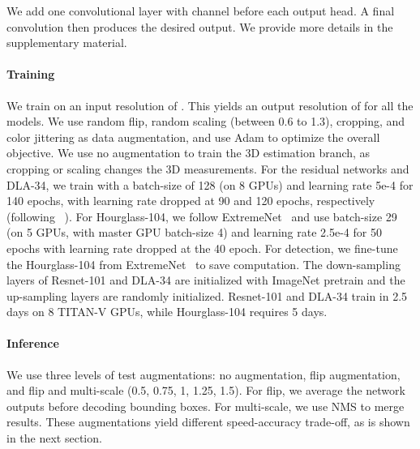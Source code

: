 \documentclass[10pt,twocolumn,letterpaper]{article}
\begin{document}
We add one  convolutional layer with  channel before each output head.
A final  convolution then produces the desired output.
We provide more details in the supplementary material.

\paragraph{Training}
We train on an input resolution of .
This yields an output resolution of  for all the models.
We use random flip, random scaling (between 0.6 to 1.3), cropping, and color jittering as data augmentation, and use Adam\cite{kingma2014adam} to optimize the overall objective.
We use no augmentation to train the 3D estimation branch, as cropping or scaling changes the 3D measurements.
For the residual networks and DLA-34, we train with a batch-size of 128 (on 8 GPUs) and learning rate 5e-4 for 140 epochs, with learning rate dropped  at 90 and 120 epochs, respectively (following ~\cite{xiao2018simple}).
For Hourglass-104, we follow ExtremeNet~\cite{zhou2019bottomup} and use batch-size 29 (on 5 GPUs, with master GPU batch-size 4) and learning rate 2.5e-4 for 50 epochs with  learning rate dropped at the 40 epoch.
For detection, we fine-tune the Hourglass-104 from ExtremeNet~\cite{zhou2019bottomup} to save computation.
The down-sampling layers of Resnet-101 and DLA-34 are initialized with ImageNet pretrain and the up-sampling layers are randomly initialized.
Resnet-101 and DLA-34 train in 2.5 days on 8 TITAN-V GPUs, while Hourglass-104 requires 5 days.

\paragraph{Inference}
We use three levels of test augmentations: no augmentation, flip augmentation, and flip and multi-scale (0.5, 0.75, 1, 1.25, 1.5).
For flip, we average the network outputs before decoding bounding boxes. For multi-scale, we use NMS to merge results.
These augmentations yield different speed-accuracy trade-off, as is shown in the next section.
\end{document}
